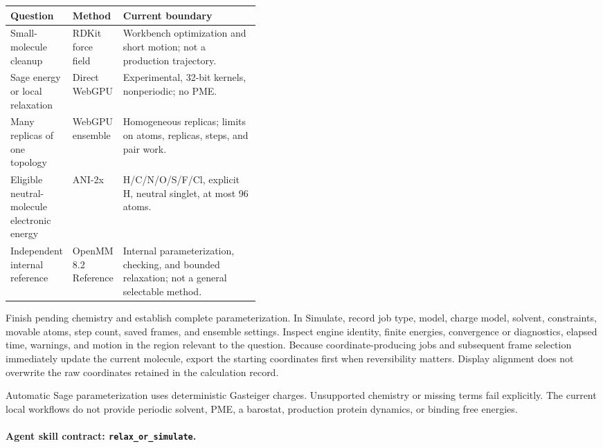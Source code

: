 \begin{small}
\begin{center}
\begin{tabularx}{\linewidth}{@{}p{0.23\linewidth}p{0.19\linewidth}X@{}}
\toprule
\textbf{Question} & \textbf{Method} & \textbf{Current boundary}\\
\midrule
Small-molecule cleanup & RDKit force field & Workbench optimization and short motion; not a production trajectory.\\
Sage energy or local relaxation & Direct WebGPU & Experimental, 32-bit kernels, nonperiodic; no PME.\\
Many replicas of one topology & WebGPU ensemble & Homogeneous replicas; limits on atoms, replicas, steps, and pair work.\\
Eligible neutral-molecule electronic energy & ANI-2x & H/C/N/O/S/F/Cl, explicit H, neutral singlet, at most 96 atoms.\\
Independent internal reference & OpenMM 8.2 Reference & Internal parameterization, checking, and bounded relaxation; not a general selectable method.\\
\bottomrule
\end{tabularx}
\end{center}

Finish pending chemistry and establish complete parameterization. In Simulate, record job type, model, charge model, solvent, constraints, movable atoms, step count, saved frames, and ensemble settings. Inspect engine identity, finite energies, convergence or diagnostics, elapsed time, warnings, and motion in the region relevant to the question. Because coordinate-producing jobs and subsequent frame selection immediately update the current molecule, export the starting coordinates first when reversibility matters. Display alignment does not overwrite the raw coordinates retained in the calculation record.

Automatic Sage parameterization uses deterministic Gasteiger charges. Unsupported chemistry or missing terms fail explicitly. The current local workflows do not provide periodic solvent, PME, a barostat, production protein dynamics, or binding free energies.

\paragraph{Agent skill contract: \texttt{relax\_or\_simulate}.}


\end{small}
